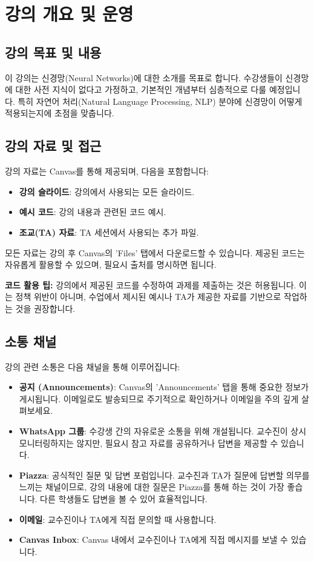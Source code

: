 \documentclass[11pt,a4paper]{book}
\theoremstyle{definition}
\begin{document}
\section*{강의 개요 및 운영}

\subsection*{강의 목표 및 내용}
이 강의는 신경망(Neural Networks)에 대한 소개를 목표로 합니다.
수강생들이 신경망에 대한 사전 지식이 없다고 가정하고, 기본적인 개념부터 심층적으로 다룰 예정입니다.
특히 자연어 처리(Natural Language Processing, NLP) 분야에 신경망이 어떻게 적용되는지에 초점을 맞춥니다.

\subsection*{강의 자료 및 접근}
강의 자료는 Canvas를 통해 제공되며, 다음을 포함합니다:
\begin{itemize}
    \item \textbf{강의 슬라이드}: 강의에서 사용되는 모든 슬라이드.
    \item \textbf{예시 코드}: 강의 내용과 관련된 코드 예시.
    \item \textbf{조교(TA) 자료}: TA 세션에서 사용되는 추가 파일.
\end{itemize}
모든 자료는 강의 후 Canvas의 'Files' 탭에서 다운로드할 수 있습니다.
제공된 코드는 자유롭게 활용할 수 있으며, 필요시 출처를 명시하면 됩니다.

\begin{infobox}
\textbf{코드 활용 팁:}
강의에서 제공된 코드를 수정하여 과제를 제출하는 것은 허용됩니다.
이는 정책 위반이 아니며, 수업에서 제시된 예시나 TA가 제공한 자료를 기반으로 작업하는 것을 권장합니다.
\end{infobox}

\subsection*{소통 채널}
강의 관련 소통은 다음 채널을 통해 이루어집니다:
\begin{itemize}
    \item \textbf{공지 (Announcements)}: Canvas의 'Announcements' 탭을 통해 중요한 정보가 게시됩니다. 이메일로도 발송되므로 주기적으로 확인하거나 이메일을 주의 깊게 살펴보세요.
    \item \textbf{WhatsApp 그룹}: 수강생 간의 자유로운 소통을 위해 개설됩니다. 교수진이 상시 모니터링하지는 않지만, 필요시 참고 자료를 공유하거나 답변을 제공할 수 있습니다.
    \item \textbf{Piazza}: 공식적인 질문 및 답변 포럼입니다. 교수진과 TA가 질문에 답변할 의무를 느끼는 채널이므로, 강의 내용에 대한 질문은 Piazza를 통해 하는 것이 가장 좋습니다. 다른 학생들도 답변을 볼 수 있어 효율적입니다.
    \item \textbf{이메일}: 교수진이나 TA에게 직접 문의할 때 사용합니다.
    \item \textbf{Canvas Inbox}: Canvas 내에서 교수진이나 TA에게 직접 메시지를 보낼 수 있습니다.
\end{itemize}
\end{document}
